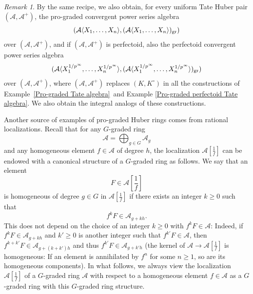 \documentclass[12pt,twoside,a4paper]{article}
\theoremstyle{definition}
\theoremstyle{remark}
\newtheorem{rmk}[thm]{Remark}
\newcommand\gr{{\rm gr}}
\begin{document}
\begin{rmk}\label{Convergent power series, general case}By the same recipe, we also obtain, for every uniform Tate Huber pair $(\mathcal{A}, \mathcal{A}^{+})$, the pro-graded convergent power series algebra \begin{equation*}(\mathcal{A}\langle X_1,\dots, X_n\rangle, (\mathcal{A}\langle X_{1},\dots, X_{n}\rangle)_{\gr})\end{equation*}over $(\mathcal{A}, \mathcal{A}^{+})$, and if $(\mathcal{A}, \mathcal{A}^{+})$ is perfectoid, also the perfectoid convergent power series algebra \begin{equation*}(\mathcal{A}\langle X_{1}^{1/p^{\infty}},\dots, X_{n}^{1/p^{\infty}}\rangle, (\mathcal{A}\langle X_{1}^{1/p^{\infty}},\dots, X_{n}^{1/p^{\infty}}\rangle)_{\gr})\end{equation*}over $(\mathcal{A}, \mathcal{A}^{+})$, where $(\mathcal{A}, \mathcal{A}^{+})$ replaces $(K, K^{\circ})$ in all the constructions of Example~\ref{Pro-graded Tate algebra} and Example \ref{Pro-graded perfectoid Tate algebra}. We also obtain the integral analogs of these constructions. \end{rmk}
Another source of examples of pro-graded Huber rings comes from rational localizations. Recall that for any $G$-graded ring \begin{equation*}\mathcal{A}=\bigoplus_{g\in G}\mathcal{A}_{g}\end{equation*}and any homogeneous element $f\in \mathcal{A}$ of degree $h$, the localization $\mathcal{A}[\frac{1}{f}]$ can be endowed with a canonical structure of a $G$-graded ring as follows. We say that an element \begin{equation*}F\in \mathcal{A}[\frac{1}{f}]\end{equation*}is homogeneous of degree $g\in G$ in $\mathcal{A}[\frac{1}{f}]$ if there exists an integer $k\geq0$ such that \begin{equation*}f^{k}F\in \mathcal{A}_{g+kh}.\end{equation*}This does not depend on the choice of an integer $k\geq0$ with $f^{k}F\in \mathcal{A}$: Indeed, if $f^{k}F\in \mathcal{A}_{g+kh}$ and $k'\geq0$ is another integer such that $f^{k'}F\in \mathcal{A}$, then $f^{k+k'}F\in \mathcal{A}_{g+(k+k')h}$ and thus $f^{k'}F\in \mathcal{A}_{g+k'h}$ (the kernel of $\mathcal{A}\to \mathcal{A}[\frac{1}{f}]$ is homogeneous: If an element is annihilated by $f^{n}$ for some $n\geq1$, so are its homogeneous components). In what follows, we always view the localization $\mathcal{A}[\frac{1}{f}]$ of a $G$-graded ring $\mathcal{A}$ with respect to a homogeneous element $f\in\mathcal{A}$ as a $G$-graded ring with this $G$-graded ring structure. 
\end{document}
